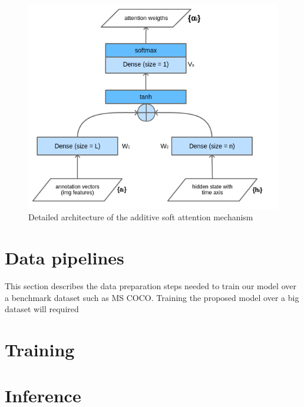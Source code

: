 \begin{figure}[hpt]
	\centering
	\includegraphics[scale=0.5]{images/ch4/attention-architecture.png}
	\caption{Detailed architecture of the additive soft attention mechanism}
	\label{fig:attention-architecture}
\end{figure}

\section{Data pipelines}

This section describes the data preparation steps needed to train our model over a benchmark dataset such as MS COCO.
Training the proposed model over a big dataset will required

\section{Training}

\section{Inference}



